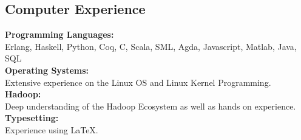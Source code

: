 \documentclass[margin]{res}
\begin{document}
\begin{resume}





\section{Computer Experience}

\textbf{Programming Languages:} \\
Erlang, Haskell, Python, Coq, C, Scala, SML, Agda, Javascript, Matlab, Java, SQL
\\
\textbf{Operating Systems:} \\
Extensive experience on the Linux OS and Linux Kernel Programming.
\\
\textbf{Hadoop:} \\
Deep understanding of the Hadoop Ecosystem as well as hands on experience.
\\
\textbf{Typesetting:} \\
Experience using \LaTeX.  %




\end{resume}
\end{document}
